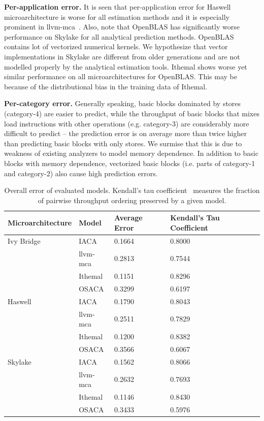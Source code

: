 \textbf{Per-application error.} It is seen that per-application error for Haswell microarchitecture is worse for all estimation methods and it is especially prominent in llvm-mca~\cite{llvm-mca}. Also, note that OpenBLAS has significantly worse performance on Skylake for all analytical prediction methods. OpenBLAS contains lot of vectorized numerical kernels. We hypothesize that vector implementations in Skylake are different from older generations and are not modelled properly by the analytical estimation tools. Ithemal shows worse yet  similar performance on all microarchitectures for OpenBLAS. This may be because of the distributional bias in the training data of Ithemal.

\textbf{Per-category error.} Generally speaking, basic blocks dominated by stores
(category-4) are easier to predict,
while the throughput of basic blocks that mixes load instructions
with other operations (e.g. category-3) are considerably
more difficult to predict -- the prediction error is on average more than
twice higher than predicting basic blocks with only stores. 
We surmise that this is due to weakness of existing analyzers to model 
memory dependence.
In addition to basic blocks with memory dependence,
vectorized basic blocks (i.e. parts of category-1 and category-2) also cause high prediction errors.
\fi



\begin{table}
\begin{tabular}
{|p{}|p{}|p{}|p{}|}
\hline

\textbf{Microarchitecture} & \textbf{Model} &
\textbf{Average Error} & \textbf{Kendall's Tau Coefficient} \\
\hline

Ivy Bridge & IACA & 0.1664 & 0.8000\\
    & llvm-mca & 0.2813 & 0.7544\\
    & Ithemal & 0.1151 & 0.8296\\
    & OSACA & 0.3299 & 0.6197\\
\hline

Haswell & IACA & 0.1790 & 0.8043\\
    & llvm-mca & 0.2511 & 0.7829\\
    & Ithemal & 0.1200 & 0.8382\\
    & OSACA & 0.3566 & 0.6067\\
    
\hline 
Skylake & IACA & 0.1562 & 0.8066\\
    & llvm-mca & 0.2632 & 0.7693\\
    & Ithemal & 0.1146 & 0.8430\\
    & OSACA & 0.3433 & 0.5976\\

\hline
\end{tabular}
\\
\caption{Overall error of evaluated models. Kendall's tau coefficient~\cite{kendalltau}
measures the fraction of pairwise throughput ordering preserved by a given model.}
\label{tab:overall}
\end{table}


